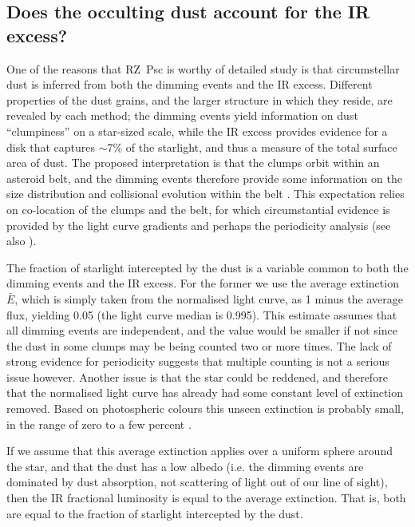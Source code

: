 \documentclass[]{rsos}
\begin{document}
\subsection{Does the occulting dust account for the IR excess?}\label{ss:ir}

One of the reasons that RZ~Psc is worthy of detailed study is that circumstellar dust is
inferred from both the dimming events and the IR excess. Different properties of the dust
grains, and the larger structure in which they reside, are revealed by each method; the
dimming events yield information on dust ``clumpiness'' on a star-sized scale, while the
IR excess provides evidence for a disk that captures $\sim$7\% of the starlight, and thus
a measure of the total surface area of dust. The proposed interpretation is that the
clumps orbit within an asteroid belt, and the dimming events therefore provide some
information on the size distribution and collisional evolution within the belt
\cite{2013A&A...553L...1D}. This expectation relies on co-location of the clumps and the
belt, for which circumstantial evidence is provided by the light curve gradients and
perhaps the periodicity analysis (see also \cite{2010A&A...524A...8G}).

The fraction of starlight intercepted by the dust is a variable common to both the
dimming events and the IR excess. For the former we use the average extinction $\bar{E}$,
which is simply taken from the normalised light curve, as 1 minus the average flux,
yielding 0.05 (the light curve median is 0.995). This estimate assumes that all dimming
events are independent, and the value would be smaller if not since the dust in some
clumps may be being counted two or more times. The lack of strong evidence for
periodicity suggests that multiple counting is not a serious issue however. Another issue
is that the star could be reddened, and therefore that the normalised light curve has
already had some constant level of extinction removed. Based on photospheric colours this
unseen extinction is probably small, in the range of zero to a few percent
\cite{2000ARep...44..611K}.

If we assume that this average extinction applies over a uniform sphere around the star,
and that the dust has a low albedo (i.e. the dimming events are dominated by dust
absorption, not scattering of light out of our line of sight), then the IR fractional
luminosity is equal to the average extinction. That is, both are equal to the fraction of
starlight intercepted by the dust.
\end{document}
